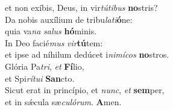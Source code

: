 \evenverse et non exíbis, Deus, in vir\textit{tú}\textit{ti}\textit{bus} \textbf{no}stris?\\
\oddverse Da nobis auxílium de tribu\textit{la}\textit{ti}\textbf{ó}ne:~\*\\
\oddverse quia va\textit{na} \textit{sa}\textit{lus} \textbf{hó}minis.\\
\evenverse In Deo facié\textit{mus} \textit{vir}\textbf{tú}tem:~\*\\
\evenverse et ipse ad níhilum dedúcet i\textit{ni}\textit{mí}\textit{cos} \textbf{no}stros.\\
\oddverse Glória Pa\textit{tri}, \textit{et} \textbf{Fí}lio,~\*\\
\oddverse et Spi\textit{rí}\textit{tu}\textit{i} \textbf{San}cto.\\
\evenverse Sicut erat in princípio, et \textit{nunc}, \textit{et} \textbf{sem}per,~\*\\
\evenverse et in sǽcula sæ\textit{cu}\textit{ló}\textit{rum}. \textbf{A}men.\\

